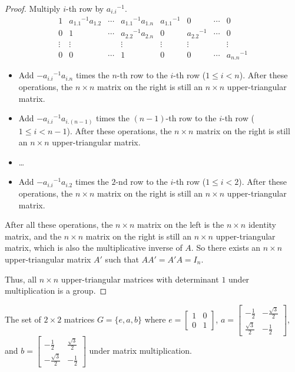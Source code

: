 \begin{proof}
    Multiply $i$-th row by ${a_{i.i}}^{-1}$.
    \[
        \begin{array}{cccc|cccc}
            1      & {a_{1.1}}^{-1}a_{1.2} & \cdots & {a_{1.1}}^{-1}a_{1.n} & {a_{1.1}}^{-1} & 0              & \cdots & 0              \\
            0      & 1                     & \cdots & {a_{2.2}}^{-1}a_{2.n} & 0              & {a_{2.2}}^{-1} & \cdots & 0              \\
            \vdots & \vdots                &        & \vdots                & \vdots         & \vdots         &        & \vdots         \\
            0      & 0                     & \cdots & 1                     & 0              & 0              & \cdots & {a_{n.n}}^{-1}
        \end{array}
    \]
    \begin{itemize}
        \item Add $-{a_{i.i}}^{-1}a_{i.n}$ times the $n$-th row to the $i$-th row ($1\le i < n$). After these operations, the $n\times n$ matrix on the right is still an $n\times n$ upper-triangular matrix.
        \item Add $-{a_{i.i}}^{-1}a_{i.(n-1)}$ times the $(n-1)$-th row to the $i$-th row ($1\le i < n-1$). After these operations, the $n\times n$ matrix on the right is still an $n\times n$ upper-triangular matrix.
        \item \ldots
        \item Add $-{a_{i.i}}^{-1}a_{i.2}$ times the $2$-nd row to the $i$-th row ($1\le i < 2$). After these operations, the $n\times n$ matrix on the right is still an $n\times n$ upper-triangular matrix.
    \end{itemize}

    After all these operations, the $n\times n$ matrix on the left is the $n\times n$ identity matrix, and the $n\times n$ matrix on the right is still an $n\times n$ upper-triangular matrix, which is also the multiplicative inverse of $A$. So there exists an $n\times n$ upper-triangular matrix $A'$ such that $AA' = A'A = I_{n}$.

    Thus, all $n\times n$ upper-triangular matrices with determinant $1$ under multiplication is a group.
\end{proof}

\begin{exercise}
    The set of $2\times 2$ matrices $G = \{ e, a, b \}$ where $e = \begin{bmatrix}1 & 0 \\ 0 & 1\end{bmatrix}$, $a = \begin{bmatrix}-\frac{1}{2} & -\frac{\sqrt{3}}{2} \\ \frac{\sqrt{3}}{2} & -\frac{1}{2}\end{bmatrix}$, and $b = \begin{bmatrix}-\frac{1}{2} & \frac{\sqrt{3}}{2} \\ -\frac{\sqrt{3}}{2} & -\frac{1}{2}\end{bmatrix}$ under matrix multiplication.
\end{exercise}

